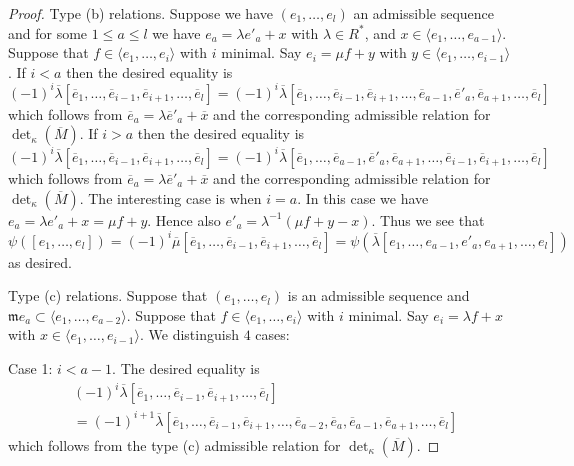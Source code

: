 \begin{proof}
\medskip\noindent
Type (b) relations. Suppose we have $(e_1, \ldots, e_l)$ an
admissible sequence and for some $1 \leq a \leq l$ we have
$e_a = \lambda e'_a + x$ with $\lambda \in R^*$, and
$x \in \langle e_1, \ldots, e_{a - 1}\rangle$.
Suppose that $f \in \langle e_1, \ldots, e_i\rangle$ with $i$ minimal.
Say $e_i = \mu f + y$ with $y \in \langle e_1, \ldots, e_{i - 1}\rangle$.
If $i < a$ then the desired equality is
$$
(-1)^i
\overline{\lambda}
[\overline{e}_1,
\ldots,
\overline{e}_{i - 1},
\overline{e}_{i + 1},
\ldots,
\overline{e}_l]
=
(-1)^i
\overline{\lambda}
[\overline{e}_1,
\ldots,
\overline{e}_{i - 1},
\overline{e}_{i + 1},
\ldots,
\overline{e}_{a - 1},
\overline{e}'_a,
\overline{e}_{a + 1},
\ldots,
\overline{e}_l]
$$
which follows from $\overline{e}_a = \lambda \overline{e}'_a + \overline{x}$
and the corresponding admissible relation for $\det_\kappa(\overline{M})$.
If $i > a$ then the desired equality is
$$
(-1)^i
\overline{\lambda}
[\overline{e}_1,
\ldots,
\overline{e}_{i - 1},
\overline{e}_{i + 1},
\ldots,
\overline{e}_l]
=
(-1)^i
\overline{\lambda}
[\overline{e}_1,
\ldots,
\overline{e}_{a - 1},
\overline{e}'_a,
\overline{e}_{a + 1},
\ldots,
\overline{e}_{i - 1},
\overline{e}_{i + 1},
\ldots,
\overline{e}_l]
$$
which follows from $\overline{e}_a = \lambda \overline{e}'_a + \overline{x}$
and the corresponding admissible relation for $\det_\kappa(\overline{M})$.
The interesting case is when $i = a$. In this case we have
$e_a = \lambda e'_a + x = \mu f + y$. Hence also
$e'_a = \lambda^{-1}(\mu f + y - x)$. Thus we see that
$$
\psi([e_1, \ldots, e_l])
= (-1)^i \overline{\mu}
[\overline{e}_1, \ldots,
\overline{e}_{i - 1},
\overline{e}_{i + 1}, \ldots, \overline{e}_l]
=
\psi(
\overline{\lambda}
[e_1, \ldots, e_{a - 1}, e'_a, e_{a + 1}, \ldots, e_l]
)
$$
as desired.

\medskip\noindent
Type (c) relations. Suppose that $(e_1, \ldots, e_l)$
is an admissible sequence and
$\mathfrak m e_a \subset \langle e_1, \ldots, e_{a - 2}\rangle$.
Suppose that $f \in \langle e_1, \ldots, e_i\rangle$ with $i$ minimal.
Say $e_i = \lambda f + x$ with $x \in \langle e_1, \ldots, e_{i - 1}\rangle$.
We distinguish $4$ cases:

\medskip\noindent
Case 1: $i < a - 1$. The desired equality is
\begin{align*}
& (-1)^i
\overline{\lambda}
[\overline{e}_1,
\ldots,
\overline{e}_{i - 1},
\overline{e}_{i + 1},
\ldots,
\overline{e}_l] \\
& =
(-1)^{i + 1}
\overline{\lambda}
[\overline{e}_1,
\ldots,
\overline{e}_{i - 1},
\overline{e}_{i + 1},
\ldots,
\overline{e}_{a - 2},
\overline{e}_a,
\overline{e}_{a - 1},
\overline{e}_{a + 1},
\ldots,
\overline{e}_l]
\end{align*}
which follows from the type (c) admissible relation for
$\det_\kappa(\overline{M})$.


\end{proof}
